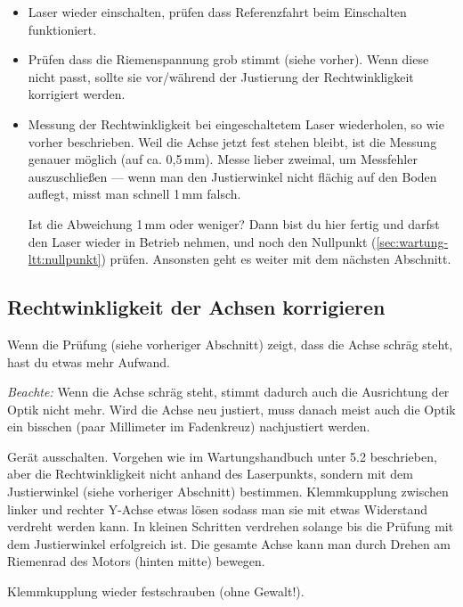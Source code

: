 \documentclass{\basedir/fablab-document}
\begin{document}
\begin{itemize}
		\item Laser wieder einschalten, prüfen dass Referenzfahrt beim Einschalten funktioniert.
		
		\item Prüfen dass die Riemenspannung grob stimmt (siehe vorher). Wenn diese nicht passt, sollte sie vor/während der Justierung der Rechtwinkligkeit korrigiert werden.
		
		\item Messung der Rechtwinkligkeit bei eingeschaltetem Laser wiederholen, so wie vorher beschrieben. Weil die Achse jetzt fest stehen bleibt, ist die Messung genauer möglich (auf ca. 0,5\,mm). Messe lieber zweimal, um Messfehler auszuschließen --- wenn man den Justierwinkel nicht flächig auf den Boden auflegt, misst man schnell 1\,mm falsch.
		
		Ist die Abweichung 1\,mm oder weniger? Dann bist du hier fertig und darfst den Laser wieder in Betrieb nehmen, und noch den Nullpunkt (\cref{sec:wartung-ltt:nullpunkt}) prüfen. Ansonsten geht es weiter mit dem nächsten Abschnitt.
	\end{itemize}
\subsection{Rechtwinkligkeit der Achsen korrigieren}
	Wenn die Prüfung (siehe vorheriger Abschnitt) zeigt, dass die Achse schräg steht, hast du etwas mehr Aufwand. 
	
	\emph{Beachte:} Wenn die Achse schräg steht, stimmt dadurch auch die Ausrichtung der Optik nicht mehr. Wird die Achse neu justiert, muss danach meist auch die Optik ein bisschen (paar Millimeter im Fadenkreuz) nachjustiert werden.
	
	Gerät ausschalten. Vorgehen wie im Wartungshandbuch unter 5.2 beschrieben, aber die Rechtwinkligkeit nicht anhand des Laserpunkts, sondern mit dem Justierwinkel (siehe vorheriger Abschnitt) bestimmen. Klemmkupplung zwischen linker und rechter Y-Achse etwas lösen sodass man sie mit etwas Widerstand verdreht werden kann. In kleinen Schritten verdrehen solange bis die Prüfung mit dem Justierwinkel erfolgreich ist. Die gesamte Achse kann man durch Drehen am Riemenrad des Motors (hinten mitte) bewegen.
	
	Klemmkupplung wieder festschrauben (ohne Gewalt!).
	
\end{document}
